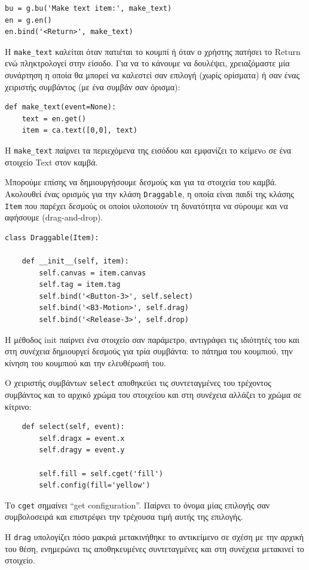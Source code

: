 \documentclass[10pt]{book}
\begin{document}
\begin{verbatim}
bu = g.bu('Make text item:', make_text)
en = g.en()
en.bind('<Return>', make_text)
\end{verbatim}
%
Η \verb"make_text" καλείται όταν πατιέται το κουμπί ή όταν ο χρήστης πατήσει
το {\sf Return} ενώ πληκτρολογεί στην είσοδο.  Για να το κάνουμε να δουλέψει, χρειαζόμαστε
μία συνάρτηση η οποία θα μπορεί να καλεστεί σαν επιλογή (χωρίς ορίσματα) ή 
σαν ένας χειριστής συμβάντος (με ένα συμβάν σαν όρισμα):

\begin{verbatim}
def make_text(event=None):
    text = en.get()
    item = ca.text([0,0], text)
\end{verbatim}
%
Η \verb"make_text" παίρνει τα περιεχόμενα της εισόδου και εμφανίζει το κείμενo σε ένα 
στοιχείο Text στον καμβά.

Μπορούμε επίσης να δημιουργήσουμε δεσμούς και για τα στοιχεία του καμβά.  Ακολουθεί ένας 
ορισμός για την κλάση {\tt Draggable}, η οποία είναι παιδί της κλάσης {\tt Item} που παρέχει
δεσμούς οι οποίοι υλοποιούν τη δυνατότητα να σύρουμε και να αφήσουμε (drag-and-drop).

\begin{verbatim}
class Draggable(Item):

    def __init__(self, item):
        self.canvas = item.canvas
        self.tag = item.tag
        self.bind('<Button-3>', self.select)
        self.bind('<B3-Motion>', self.drag)
        self.bind('<Release-3>', self.drop)
\end{verbatim}
%
Η μέθοδος init παίρνει ένα στοιχείο σαν παράμετρο, αντιγράφει τις ιδιότητές του και στη συνέχεια δημιουργεί
δεσμούς για τρία συμβάντα: το πάτημα του κουμπιού, την κίνηση του κουμπιού και την ελευθέρωσή του.

Ο χειριστής συμβάντων {\tt select} αποθηκεύει τις συντεταγμένες του τρέχοντος συμβάντος και το αρχικό χρώμα
του στοιχείου και στη συνέχεια αλλάζει το χρώμα σε κίτρινο:

\begin{verbatim}
    def select(self, event):
        self.dragx = event.x
        self.dragy = event.y

        self.fill = self.cget('fill')
        self.config(fill='yellow')
\end{verbatim}
%
Το {\tt cget} σημαίνει ``get configuration''.  Παίρνει το όνομα μίας επιλογής σαν συμβολοσειρά
και επιστρέφει την τρέχουσα τιμή αυτής της επιλογής.

Η {\tt drag} υπολογίζει πόσο μακριά μετακινήθηκε το αντικείμενο σε σχέση με την 
αρχική του θέση, ενημερώνει τις αποθηκευμένες συντεταγμένες και στη συνέχεια μετακινεί
το στοιχείο. 
\end{document}
